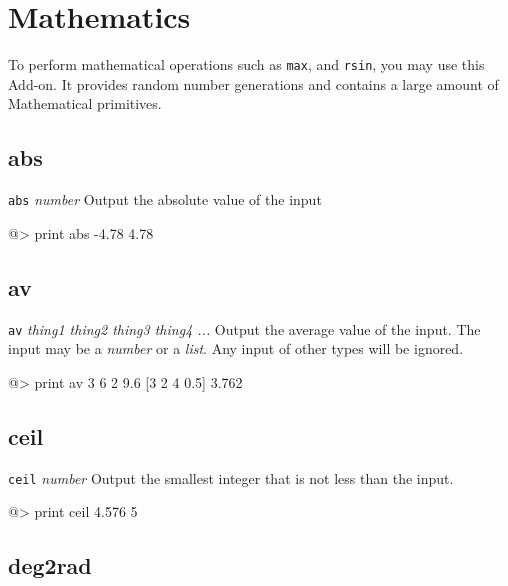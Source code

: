 \section{Mathematics} 
 
To perform mathematical operations such as {\tt max}, and {\tt rsin}, you may use this Add-on. It provides random number generations and contains a large amount of Mathematical primitives. 
 
 
\subsection*{abs}  
 
{\tt abs} {\it number} 
\newline\newline 
Output the absolute value of the input 
\begin{verbatimtab} 
@> print abs -4.78 
4.78 
\end{verbatimtab} 
 
 
\subsection*{av}  
 
{\tt av} {\it thing1 thing2 thing3 thing4 ...} 
\newline\newline 
Output the average value of the input. The input may be a {\it number} or a {\it list}. Any input of other types will be ignored. 
\begin{verbatimtab} 
@> print av 3 6 2 9.6 [3 2 4 0.5] 
3.762 
\end{verbatimtab} 
 
\subsection*{ceil}  
 
{\tt ceil} {\it number} 
\newline\newline 
Output the smallest integer that is not less than the input. 
\begin{verbatimtab} 
@> print ceil 4.576
5 
\end{verbatimtab} 

\subsection*{deg2rad}  
 
